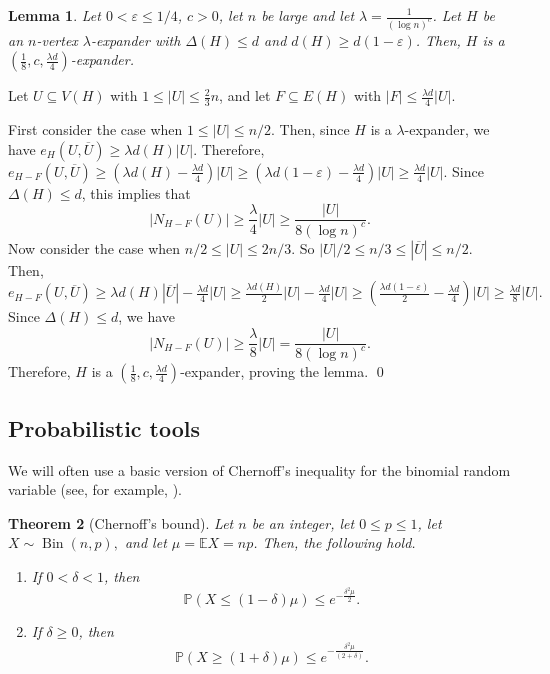 \documentclass[10pt]{article}
\theoremstyle{plain}
\newtheorem{theorem}{Theorem}
\numberwithin{theorem}{section}
\newtheorem{lemma}[theorem]{Lemma}
\theoremstyle{definition}
\theoremstyle{remark}
\renewenvironment{proof}[1][]{\begin{trivlist}
\item[\hspace{\labelsep}{\bf\noindent Proof#1.\/}] }{\qed\end{trivlist}}
\renewcommand{\P}{\mathcal{P}}
\newcommand{\eps}{\varepsilon}
\renewcommand{\P}{\mathbb{P}}
\DeclareMathOperator{\bin}{Bin}
\theoremstyle{plain}
\begin{document}
\begin{lemma}
	\label{lem:relateexpanders}
	Let $0 < \eps \le 1/4$, $c > 0$, let $n$ be large and let $\lambda = \frac{1}{(\log n)^c}$. Let $H$ be an $n$-vertex $\lambda$-expander with $\Delta(H) \le d$ and $d(H) \ge d(1 - \eps)$. Then, $H$ is a $(\frac{1}{8}, c, \frac{\lambda d}{4})$-expander. 
\end{lemma}
\begin{proof}
	Let $U \subseteq V(H)$ with $1 \le |U| \le \frac{2}{3} n$, and let $F \subseteq E(H)$ with $|F| \le \frac{\lambda d}{4} |U|$. 

	First consider the case when $1 \le |U| \le n/2$. Then, since $H$ is a $\lambda$-expander, we have $e_H(U, \overline{U}) \ge \lambda d(H) |U|$. Therefore, $e_{H-F}(U, \overline{U}) \ge (\lambda d(H) - \frac{\lambda d}{4}) |U| \ge (\lambda d(1 - \eps) - \frac{\lambda d}{4}) |U| \ge \frac{\lambda d}{4} |U|$. Since $\Delta(H) \le d$, this implies that 
	\begin{equation*}
		|N_{H - F}(U)| \ge \frac{\lambda}{4} |U| \ge \frac{|U|}{8 (\log n)^c}.
	\end{equation*}
	Now consider the case when $n/2 \le |U| \le 2n/3$. So $|U|/2 \le n/3 \le |\overline{U}| \le n/2$. Then, $e_{H-F}(U, \overline{U}) \ge \lambda d(H) |\overline{U}| - \frac{\lambda d}{4} |U| \ge \frac{\lambda d(H)}{2} |U| - \frac{\lambda d}{4} |U| \ge (\frac{\lambda d(1 - \eps) }{2}- \frac{\lambda d}{4}) |U| \ge \frac{\lambda d}{8} |U|.$ Since $\Delta(H) \le d$, we have 
	$$ |N_{H - F}(U)| \ge \frac{\lambda}{8} |U| = \frac{|U|}{8 (\log n)^c}.$$
	Therefore, $H$ is a $(\frac{1}{8}, c, \frac{\lambda d}{4})$-expander, proving the lemma.
\end{proof}

\subsection{Probabilistic tools}\label{sec:conc}
We will often use a basic version of Chernoff's inequality for the binomial random variable (see, for example, \cite{alon2016probabilistic, upfal2005probability}).

\begin{theorem}[Chernoff's bound]\label{chernoff}
Let $n$ be an integer, let $0\le p \le 1$, let $X \sim \bin(n,p),$ and let $\mu=\mathbb{E} X = np$. Then, the following hold.

\begin{enumerate}[label = \rm(\roman*)]
    \item If $0 < \delta < 1$, then $$\P(X \le (1-\delta) \mu) \le e^{-\frac{\delta^2\mu}{2}}.$$
    \item If $\delta \ge 0$, then $$\P(X\geq (1+\delta )\mu )\le e^{-\frac{\delta^{2}\mu}{(2+\delta )}}.$$
\end{enumerate}
\end{theorem}
\end{document}

